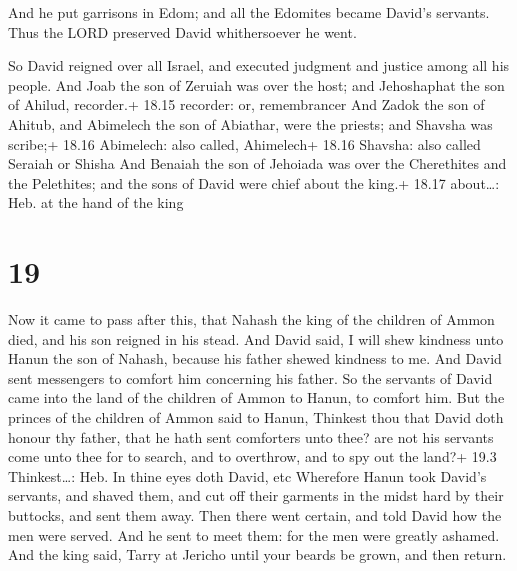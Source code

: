  And he put garrisons in Edom; and all the Edomites
became David's servants. Thus the LORD preserved David whithersoever he
went.

 So David reigned over all Israel, and executed judgment
and justice among all his people.  And Joab the son of
Zeruiah was over the host; and Jehoshaphat the son of Ahilud, recorder.+
18.15 recorder: or, remembrancer  And Zadok the son of
Ahitub, and Abimelech the son of Abiathar, were the priests; and Shavsha
was scribe;+ 18.16 Abimelech: also called, Ahimelech+ 18.16 Shavsha:
also called Seraiah or Shisha  And Benaiah the son of
Jehoiada was over the Cherethites and the Pelethites; and the sons of
David were chief about the king.+ 18.17 about\ldots: Heb. at the hand of
the king

\hypertarget{section-18}{%
\section{19}\label{section-18}}

 Now it came to pass after this, that Nahash the king of the
children of Ammon died, and his son reigned in his stead. 
And David said, I will shew kindness unto Hanun the son of Nahash,
because his father shewed kindness to me. And David sent messengers to
comfort him concerning his father. So the servants of David came into
the land of the children of Ammon to Hanun, to comfort him. 
But the princes of the children of Ammon said to Hanun, Thinkest thou
that David doth honour thy father, that he hath sent comforters unto
thee? are not his servants come unto thee for to search, and to
overthrow, and to spy out the land?+ 19.3 Thinkest\ldots: Heb. In thine
eyes doth David, etc  Wherefore Hanun took David's servants,
and shaved them, and cut off their garments in the midst hard by their
buttocks, and sent them away.  Then there went certain, and
told David how the men were served. And he sent to meet them: for the
men were greatly ashamed. And the king said, Tarry at Jericho until your
beards be grown, and then return.

